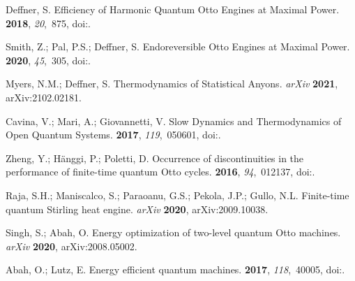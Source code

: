 \documentclass[preprints,article,accept,moreauthors,pdftex]{Definitions/mdpi}
\begin{document}
\begin{thebibliography}{999}
Deffner, S.
\newblock Efficiency of Harmonic Quantum {Otto} Engines at Maximal Power.
 {\bf 2018}, {\em 20},~875,
\newblock
  doi:{\href{https://doi.org/10.3390/e20110875}{}}.

Smith, Z.; Pal, P.S.; Deffner, S.
\newblock Endoreversible {O}tto Engines at Maximal Power.
 {\bf 2020}, {\em 45},~305,
\newblock
  doi:{\href{https://doi.org/doi:10.1515/jnet-2020-0039}{}}.

Myers, N.M.; Deffner, S.
\newblock Thermodynamics of Statistical Anyons.  \emph{arXiv} \textbf{2021}, arXiv:2102.02181.


Cavina, V.; Mari, A.; Giovannetti, V.
\newblock Slow Dynamics and Thermodynamics of Open Quantum Systems.
 {\bf 2017}, {\em 119},~050601,
\newblock
  doi:{\href{https://doi.org/10.1103/PhysRevLett.119.050601}{}}.

Zheng, Y.; H\"anggi, P.; Poletti, D.
\newblock Occurrence of discontinuities in the performance of finite-time
  quantum {Otto} cycles.
 {\bf 2016}, {\em 94},~012137,
\newblock
  doi:{\href{https://doi.org/10.1103/PhysRevE.94.012137}{}}.

Raja, S.H.; Maniscalco, S.; Paraoanu, G.S.; Pekola, J.P.; Gullo, N.L.
\newblock Finite-time quantum {S}tirling heat engine. \emph{arXiv}  \textbf{2020}, arXiv:2009.10038.


Singh, S.; Abah, O.
\newblock Energy optimization of two-level quantum {O}tto machines. \emph{arXiv}  \textbf{2020}, arXiv:2008.05002.


Abah, O.; Lutz, E.
\newblock Energy efficient quantum machines.
 {\bf 2017}, {\em 118},~40005,
\newblock
  doi:{\href{https://doi.org/10.1209/0295-5075/118/40005}{}}.


\end{thebibliography}
\end{document}
